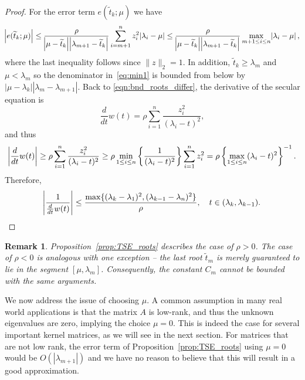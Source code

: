 \documentclass[11pt]{article}
\newtheorem{remark}{Remark}[section]
\begin{document}
\begin{proof}
For the error term $e(\widetilde{t}_k;\mu)$ we have
\begin{equation} \label{eq:min1}
\abs{e(\widetilde{t}_k;\mu)} \leq \frac{\rho}{\abs{\mu - \widetilde{t}_k}\abs{\lambda_{m+1}-\widetilde{t}_k} }\sum_{i=m+1}^{n} z_i^2 \abs{\lambda_i - \mu} \leq \frac{\rho}{\abs{\mu - \widetilde{t}_k}\abs{\lambda_{m+1}-\widetilde{t}_k} } \max_{m+1 \leq i \leq n}\abs{\lambda_i - \mu} ,
\end{equation}
where the last inequality follows since $\|z\|_2 = 1$. In addition, $\widetilde{t}_k\ge\lambda_{m}$ and $\mu < \lambda_{m}$ so the denominator in~\eqref{eq:min1} is bounded from below by $|\mu - \lambda_{k}||\lambda_m - \lambda_{m+1}|$. Back to \eqref{eqn:bnd_roots_differ}, the derivative of the secular equation is
\begin{equation}
\frac{d}{dt}w(t) =  \rho \sum_{i=1}^n \frac{z_i^2}{(\lambda_i-t)^2} ,
\end{equation}
and thus
\begin{equation}
\abs{ \frac{d}{dt}w(t)} \ge \rho \sum_{i=1}^n \frac{z_i^2}{(\lambda_i-t)^2} \ge  \rho \min_{1\le i\le n}  \left\lbrace \frac{1}{(\lambda_i-t)^2}\right\rbrace  \sum_{i=1}^n z_i^2 = \rho \left\lbrace \max_{1\le i\le n}(\lambda_i-t)^2 \right\rbrace^{-1} .
\end{equation}
Therefore, 
\begin{equation}
\abs{\frac{1}{ \frac{d}{dt}w(t)}} \le \frac{\max \{ (\lambda_{k} - \lambda_1)^2,(\lambda_{k-1} - \lambda_{n})^2 \} }{\rho  } , \quad t\in ( \lambda_{k},\lambda_{k-1} ).
\end{equation}
\end{proof}
\begin{remark}
Proposition~\ref{prop:TSE_roots} describes the case of $\rho>0$. The case of $\rho<0$ is analogous with one exception -- the last root $\widetilde{t}_m$ is merely guaranteed to lie in the segment $[\mu,\lambda_{m}]$.
Consequently, the constant $C_m$ cannot be bounded with the same arguments.
\end{remark}

We now address the issue of choosing $\mu$. A common assumption in many real world applications is that the matrix $A$ is low-rank, and thus the unknown eigenvalues are zero, implying the choice $\mu = 0$. This is indeed the case for several important kernel matrices, as we will see in the next section. For matrices that are not low rank, the error term of Proposition~\ref{prop:TSE_roots} using $\mu = 0$ would be $O(|\lambda_{m+1}|)$ and we have no reason to believe that this will result in a good approximation. 
\end{document}
